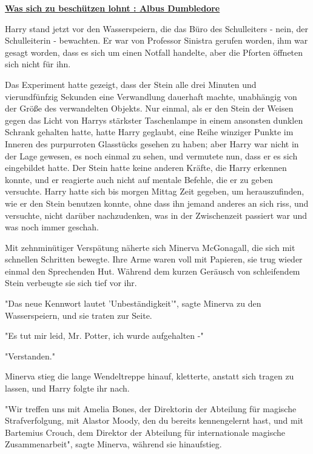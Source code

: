 

\hypertarget{was-sich-zu-beschuxfctzen-lohnt-albus-dumbledore}{%

\textbf{\uline{Was sich zu beschützen lohnt : Albus Dumbledore}}

Harry stand jetzt vor den Wasserspeiern, die das Büro des Schulleiters - nein, der Schulleiterin - bewachten. Er war von Professor Sinistra gerufen worden, ihm war gesagt worden, dass es sich um einen Notfall handelte, aber die Pforten öffneten sich nicht für ihn.

Das Experiment hatte gezeigt, dass der Stein alle drei Minuten und vierundfünfzig Sekunden eine Verwandlung dauerhaft machte, unabhängig von der Größe des verwandelten Objekts. Nur einmal, als er den Stein der Weisen gegen das Licht von Harrys stärkster Taschenlampe in einem ansonsten dunklen Schrank gehalten hatte, hatte Harry geglaubt, eine Reihe winziger Punkte im Inneren des purpurroten Glasstücks gesehen zu haben; aber Harry war nicht in der Lage gewesen, es noch einmal zu sehen, und vermutete nun, dass er es sich eingebildet hatte. Der Stein hatte keine anderen Kräfte, die Harry erkennen konnte, und er reagierte auch nicht auf mentale Befehle, die er zu geben versuchte. Harry hatte sich bis morgen Mittag Zeit gegeben, um herauszufinden, wie er den Stein benutzen konnte, ohne dass ihn jemand anderes an sich riss, und versuchte, nicht darüber nachzudenken, was in der Zwischenzeit passiert war und was noch immer geschah.

Mit zehnminütiger Verspätung näherte sich Minerva McGonagall, die sich mit schnellen Schritten bewegte. Ihre Arme waren voll mit Papieren, sie trug wieder einmal den Sprechenden Hut. Während dem kurzen Geräusch von schleifendem Stein verbeugte sie sich tief vor ihr.

"Das neue Kennwort lautet 'Unbeständigkeit'", sagte Minerva zu den Wasserspeiern, und sie traten zur Seite.

"Es tut mir leid, Mr. Potter, ich wurde aufgehalten -"

"Verstanden."

Minerva stieg die lange Wendeltreppe hinauf, kletterte, anstatt sich tragen zu lassen, und Harry folgte ihr nach.

"Wir treffen uns mit Amelia Bones, der Direktorin der Abteilung für magische Strafverfolgung, mit Alastor Moody, den du bereits kennengelernt hast, und mit Bartemius Crouch, dem Direktor der Abteilung für internationale magische Zusammenarbeit", sagte Minerva, während sie hinaufstieg.

}

